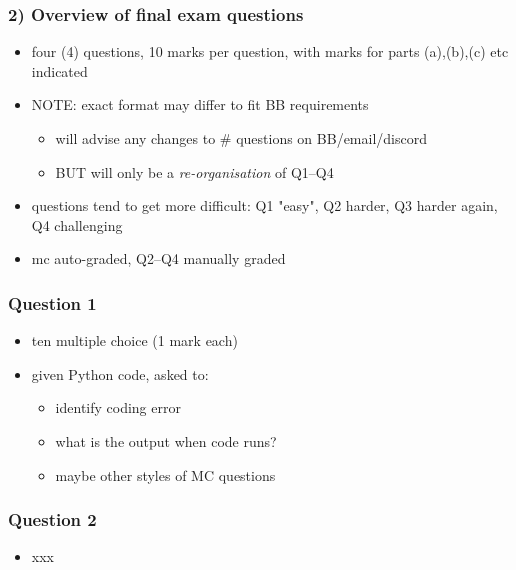 \documentclass[english,14pt]{beamer}
\begin{document}

\begin{frame}[fragile]

\frametitle{2) Overview of final exam questions}

\begin{itemize}
	\item four (4) questions, 10 marks per question, with marks for parts (a),(b),(c) etc indicated
	\item NOTE: exact format may differ to fit BB requirements
	\begin{itemize}
		\item will advise any changes to \# questions on BB/email/discord
		\item BUT will only be a \emph{re-organisation} of Q1--Q4
	\end{itemize}
	\item questions tend to get more difficult: Q1 "easy", Q2 harder, Q3 harder again, Q4 challenging
	\item mc auto-graded, Q2--Q4 manually graded
\end{itemize}
\end{frame}




\begin{frame}[fragile]

\frametitle{Question 1}

\begin{itemize}
	\item ten multiple choice (1 mark each)
	\item given Python code, asked to:
	\begin{itemize}
		\item identify coding error
		\item what is the output when code runs?
		\item maybe other styles of MC questions
	\end{itemize}
	
\end{itemize}

\end{frame}


\begin{frame}[fragile]

\frametitle{Question 2}

\begin{itemize}
	\item xxx
\end{itemize}

\end{frame}
\end{document}
